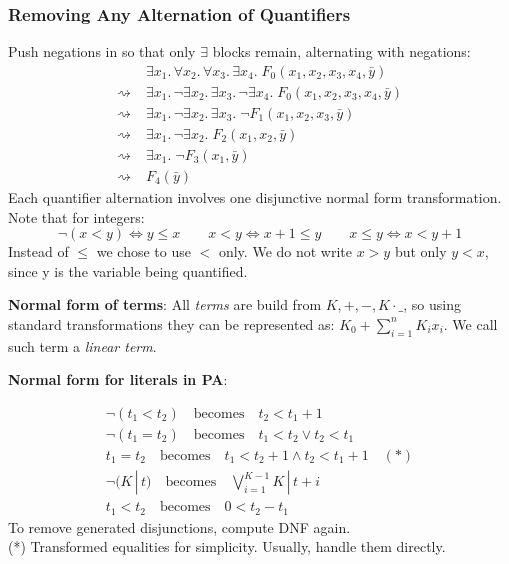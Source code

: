 \documentclass[11pt]{article}
\begin{document}
\subsubsection*{Removing Any Alternation of Quantifiers}
Push negations in so that only $\exists$ blocks remain, alternating with negations:
\begin{align*}
&\exists x_1.\,\forall x_2.\,\forall x_3.\,\exists x_4.\;F_0(x_1,x_2,x_3,x_4,\bar{y})\\
\rightsquigarrow\;&\exists x_1.\,\neg\exists x_2.\,\exists x_3.\,\neg\exists x_4.\;F_0(x_1,x_2,x_3,x_4,\bar{y})\\
\rightsquigarrow\;&\exists x_1.\,\neg\exists x_2.\,\exists x_3.\;\neg F_1(x_1,x_2,x_3,\bar{y})\\
\rightsquigarrow\;&\exists x_1.\,\neg\exists x_2.\;F_2(x_1,x_2,\bar{y})\\
\rightsquigarrow\;&\exists x_1.\;\neg F_3(x_1,\bar{y})\\
\rightsquigarrow\;&F_4(\bar{y})
\end{align*}
Each quantifier alternation involves one disjunctive normal form transformation.
Note that for integers: $$\neg(x < y) \Leftrightarrow y \leq x \quad \quad x < y \Leftrightarrow x + 1 \leq y \quad \quad x \leq y \Leftrightarrow x < y + 1$$ Instead of $\leq$ we chose to use $<$ only. We do not write $x > y$ but only $y < x$, since y is the variable being quantified. 

\textbf{Normal form of terms}: All \textit{terms} are build from $K, +, -, K \cdot \_$, so using standard transformations they can be represented as: $K_0 + \sum^{n}_{i = 1} K_i x_i$. We call such term a \textit{linear term}.

\textbf{Normal form for literals in PA}:

\[
\begin{array}{l}
	\neg (t_1 < t_2) \quad \text{becomes} \quad t_2 < t_1 + 1 \\
	\neg (t_1 = t_2) \quad \text{becomes} \quad t_1 < t_2 \lor t_2 < t_1 \\ 
	t_1 = t_2 \quad \text{becomes} \quad t_1 < t_2 + 1 \land t_2 < t_1 + 1 \quad (*) \\ 
	\neg (K \, | \, t) \quad \text{becomes} \quad \bigvee^{K-1}_{i=1} K \, | \, t + i \\
	t_1 < t_2 \quad \text{becomes} \quad 0 < t_2 - t_1
\end{array}
\] 
To remove generated disjunctions, compute DNF again. \\
(*) Transformed equalities for simplicity. Usually, handle them directly. 
\end{document}
